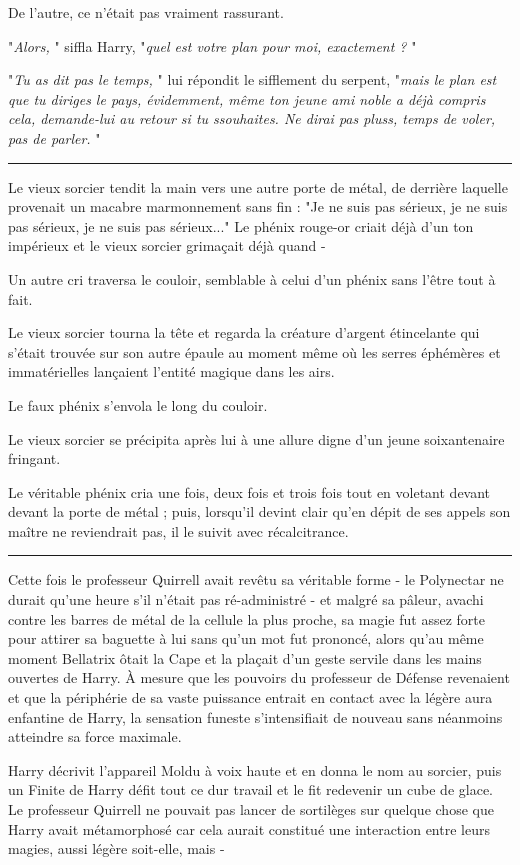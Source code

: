De l'autre, ce n'était pas vraiment rassurant.

"\emph{Alors,} " siffla Harry, "\emph{quel est votre plan pour moi, exactement ?} "

"\emph{Tu as dit pas le temps,} " lui répondit le sifflement du serpent, "\emph{mais le plan est que tu diriges le pays, évidemment, même ton jeune ami noble a déjà compris cela, demande-lui au retour si tu ssouhaites. Ne dirai pas pluss, temps de voler, pas de parler.} "
\par\noindent\rule{\textwidth}{0.4pt}
Le vieux sorcier tendit la main vers une autre porte de métal, de derrière laquelle provenait un macabre marmonnement sans fin : "Je ne suis pas sérieux, je ne suis pas sérieux, je ne suis pas sérieux..." Le phénix rouge-or criait déjà d'un ton impérieux et le vieux sorcier grimaçait déjà quand -

Un autre cri traversa le couloir, semblable à celui d'un phénix sans l'être tout à fait.

Le vieux sorcier tourna la tête et regarda la créature d'argent étincelante qui s'était trouvée sur son autre épaule au moment même où les serres éphémères et immatérielles lançaient l'entité magique dans les airs.

Le faux phénix s'envola le long du couloir.

Le vieux sorcier se précipita après lui à une allure digne d'un jeune soixantenaire fringant.

Le véritable phénix cria une fois, deux fois et trois fois tout en voletant devant devant la porte de métal ; puis, lorsqu'il devint clair qu'en dépit de ses appels son maître ne reviendrait pas, il le suivit avec récalcitrance.
\par\noindent\rule{\textwidth}{0.4pt}
Cette fois le professeur Quirrell avait revêtu sa véritable forme - le Polynectar ne durait qu'une heure s'il n'était pas ré-administré - et malgré sa pâleur, avachi contre les barres de métal de la cellule la plus proche, sa magie fut assez forte pour attirer sa baguette à lui sans qu'un mot fut prononcé, alors qu'au même moment Bellatrix ôtait la Cape et la plaçait d'un geste servile dans les mains ouvertes de Harry. À mesure que les pouvoirs du professeur de Défense revenaient et que la périphérie de sa vaste puissance entrait en contact avec la légère aura enfantine de Harry, la sensation funeste s'intensifiait de nouveau sans néanmoins atteindre sa force maximale.

Harry décrivit l'appareil Moldu à voix haute et en donna le nom au sorcier, puis un Finite de Harry défit tout ce dur travail et le fit redevenir un cube de glace. Le professeur Quirrell ne pouvait pas lancer de sortilèges sur quelque chose que Harry avait métamorphosé car cela aurait constitué une interaction entre leurs magies, aussi légère soit-elle, mais -

